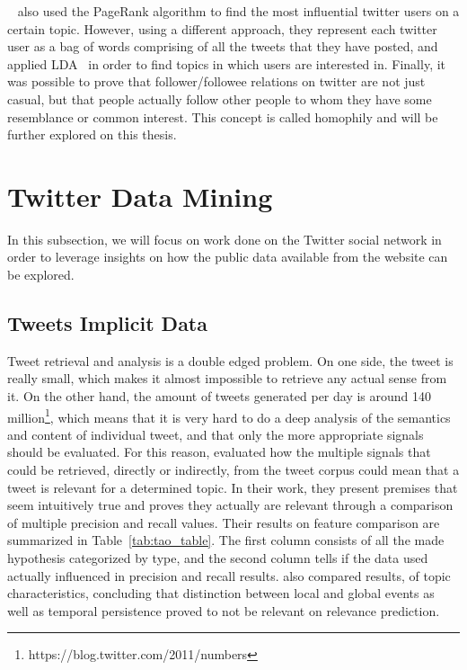 ~\citet{Weng2010} also used the PageRank algorithm to find the most influential twitter users on a certain topic. However, using a different approach, they represent each twitter user as a bag of words comprising of all the tweets that they have posted, and applied \ac{LDA}~\cite{Blei2003} in order to find topics in which users are interested in. Finally, it was possible to prove that follower/followee relations on twitter are not just casual, but that people actually follow other people to whom they have some resemblance or common interest. This concept is called homophily and will be further explored on this thesis.

\section{Twitter Data Mining} 
\label{sec:data_mining_in_twitter_}
In this subsection, we will focus on work done on the Twitter social network in order to leverage insights on how the public data available from the website can be explored. 

\subsection{Tweets Implicit Data} 
\label{sub:the_tweet}
Tweet retrieval and analysis is a double edged problem. On one side, the tweet is really small, which makes it almost impossible to retrieve any actual sense from it. On the other hand, the amount of tweets generated per day is around 140 million\footnote{https://blog.twitter.com/2011/numbers}, which means that it is very hard to do a deep analysis of the semantics and content of individual tweet, and that only the more appropriate signals should be evaluated.
For this reason, \citet{Tao2012} evaluated how the multiple signals that could be retrieved, directly or indirectly, from the tweet corpus could mean that a tweet is relevant for a determined topic. In their work, they present premises that seem intuitively true and proves they actually are relevant through a comparison of multiple precision and recall values. Their results on feature comparison are summarized in Table~\ref{tab:tao_table}. The first column consists of all the made hypothesis categorized by type, and the second column tells if the data used actually influenced in precision and recall results. \citet{Tao2012} also compared results, of topic characteristics, concluding that distinction between local and global events as well as temporal persistence proved to not be relevant on relevance prediction.

